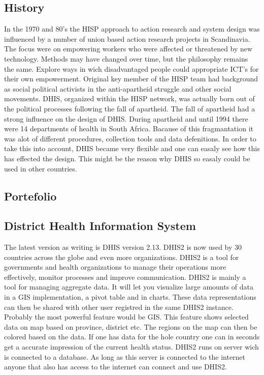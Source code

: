 \subsection{History}
In the 1970 and 80's the HISP approach to action research and system design was influenced by a number of union based action research projects in Scandinavia.
The focus were on empowering workers who were affected or threatened by new technology.
Methods may have changed over time, but the philosophy remains the same. Explore ways in wich disadvantaged people could appropriate ICT's for their own empowerment.
Original key member of the HISP team had background as social political activists in the anti-apartheid struggle and other social movements.
DHIS, organized within the HISP network, was actually born out of the political processes following the fall of apartheid\cite{7}. 
The fall of apartheid had a strong influence on the design of DHIS. During apartheid and until 1994 there were 14 departments of health in South Africa.
Bacause of this fragmantation it was alot of different procedures, collection tools and data defenitions. In order to take this into account, DHIS became very flexible and one can easaly see how this has effected the design. 
This might be the reason why DHIS so easaly could be used in other countries.


\subsection{Portefolio}




\subsection{District Health Information System}

The latest version as writing is DHIS version 2.13.
DHIS2 is now used by 30 countries across the globe and even more organizations. DHIS2 is a tool for governments and health organizations to manage their operations more effectively, monitor processes and improve communication.
DHIS2 is mainly a tool for managing aggregate data. It will let you visualize large amounts of data in a GIS implementation, a pivot table and in charts. These data representations can then be shared with other user registred in the same DHIS2 instance.
Probably the most powerful feature would be GIS. This feature shows selected data on map based on province, district etc. The regions on the map can then be colored based on the data. 
If one has data for the hole country one can in seconds get  a accurate impression of the current health status. DHIS2 runs on server wich is connected to a database. As long as this server is connected to the internet anyone that also has access to the internet can connect and use DHIS2.
